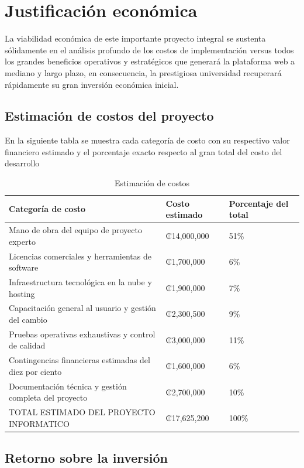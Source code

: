 \documentclass[11pt,spanish]{article}
\begin{document}
\section{Justificación económica}

La viabilidad económica de este importante proyecto integral se sustenta sólidamente en el análisis profundo de los costos de implementación versus todos los grandes beneficios operativos y estratégicos que generará la plataforma web a mediano y largo plazo, en consecuencia, la prestigiosa universidad recuperará rápidamente su gran inversión económica inicial.

\subsection{Estimación de costos del proyecto}

En la siguiente tabla se muestra cada categoría de costo con su respectivo valor financiero estimado y el porcentaje exacto respecto al gran total del costo del desarrollo

\begin{table}[H]
\centering
\small
\caption{Estimación de costos}\label{tab:costos}
\begin{tabularx}{\textwidth}{Y p{4.1cm} p{3.2cm}}
\toprule
\textbf{Categoría de costo} & \textbf{Costo estimado} & \textbf{Porcentaje del total} \\
\midrule
Mano de obra del equipo de proyecto experto & ₡14,000,000 & 51\% \\
Licencias comerciales y herramientas de software & ₡1,700,000 & 6\% \\
Infraestructura tecnológica en la nube y hosting & ₡1,900,000 & 7\% \\
Capacitación general al usuario y gestión del cambio & ₡2,300,500 & 9\% \\
Pruebas operativas exhaustivas y control de calidad & ₡3,000,000 & 11\% \\
Contingencias financieras estimadas del diez por ciento & ₡1,600,000 & 6\% \\
Documentación técnica y gestión completa del proyecto & ₡2,700,000 & 10\% \\
TOTAL ESTIMADO DEL PROYECTO INFORMATICO & ₡17,625,200 & 100\% \\
\bottomrule
\end{tabularx}
\end{table}

\subsection{Retorno sobre la inversión}
\end{document}
